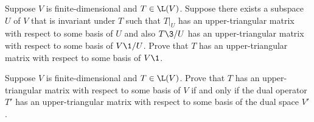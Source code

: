 \exercise
Suppose $V$ is finite-dimensional and $T \in \L(V)$. Suppose there exists a subspace $U$ of $V$ that is invariant under $T$ such that $T|_U$ has an upper-triangular matrix with respect to some basis of $U$ and also $T\3/U$ has an upper-triangular matrix with respect to some basis of $V\1/U$. Prove that $T$ has an upper-triangular matrix with respect to some basis of $V\1$.\label{6Tutm}


\exercise
Suppose $V$ is finite-dimensional and $T \in \L(V)$. Prove that $T$ has an upper-triangular matrix with respect to some basis of $V$ if and only if the dual operator $T'$ has an upper-triangular matrix with respect to some basis of the dual space $V'\!$.


